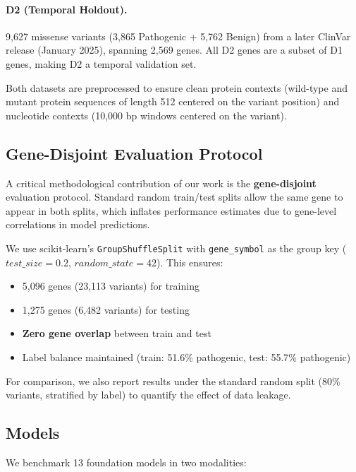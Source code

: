 \documentclass{article}
\begin{document}
\paragraph{D2 (Temporal Holdout).} 9,627 missense variants (3,865 Pathogenic + 5,762 Benign) from a later ClinVar release (January 2025), spanning 2,569 genes. All D2 genes are a subset of D1 genes, making D2 a temporal validation set.

Both datasets are preprocessed to ensure clean protein contexts (wild-type and mutant protein sequences of length 512 centered on the variant position) and nucleotide contexts (10,000 bp windows centered on the variant).

\subsection{Gene-Disjoint Evaluation Protocol}

A critical methodological contribution of our work is the \textbf{gene-disjoint} evaluation protocol. Standard random train/test splits allow the same gene to appear in both splits, which inflates performance estimates due to gene-level correlations in model predictions.

We use scikit-learn's \texttt{GroupShuffleSplit} with \texttt{gene\_symbol} as the group key ($test\_size = 0.2$, $random\_state = 42$). This ensures:
\begin{itemize}
    \item 5,096 genes (23,113 variants) for training
    \item 1,275 genes (6,482 variants) for testing
    \item \textbf{Zero gene overlap} between train and test
    \item Label balance maintained (train: 51.6\% pathogenic, test: 55.7\% pathogenic)
\end{itemize}

For comparison, we also report results under the standard random split (80\% variants, stratified by label) to quantify the effect of data leakage.

\subsection{Models}

We benchmark 13 foundation models in two modalities:
\end{document}
